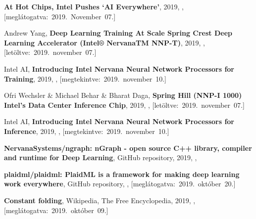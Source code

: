 \begin{thebibliography}{9}
	\textbf{At Hot Chips, Intel Pushes ‘AI Everywhere’},
	2019,
	,
	\mbox{[meglátogatva:~2019.~November~07.]}

	Andrew Yang,
	\textbf{Deep Learning Training At Scale	Spring Crest Deep Learning Accelerator (Intel® NervanaTM NNP-T)},
	2019,
	,
	\mbox{[letöltve:~2019.~november~07.]}

	Intel AI,
	\textbf{Introducing Intel Nervana Neural Network Processors for Training},
	2019,
	,
	\mbox{[megtekintve:~2019.~november~10.]}

	Ofri Wechsler \& Michael Behar \& Bharat Daga,
	\textbf{Spring Hill (NNP-I 1000) Intel’s Data Center Inference Chip},
	2019,
	,
	\mbox{[letöltve:~2019.~november~07.]}

	Intel AI,
	\textbf{Introducing Intel Nervana Neural Network Processors for Inference},
	2019,
	,
	\mbox{[megtekintve:~2019.~november~10.]}


	\textbf{NervanaSystems/ngraph: nGraph - open source C++ library, compiler and runtime for Deep Learning},
	GitHub repository,
	2019,
	,

	\textbf{plaidml/plaidml: PlaidML is a framework for making deep learning work everywhere},
	GitHub repository,
	,
	\mbox{[meglátogatva:~2019.~október~20.]}


	\textbf{Constant folding},
	{Wikipedia}{,} The Free Encyclopedia,
	2019,
	,
	\mbox{[meglátogatva:~2019.~október~09.]}


\end{thebibliography}
